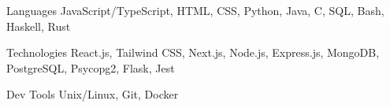 \begin{cvskills}
    \cvskill
        {Languages} %
        {JavaScript/TypeScript, HTML, CSS, Python, Java, C, SQL, Bash, Haskell, Rust} %
    
    \cvskill
        {Technologies} %
        {React.js, Tailwind CSS, Next.js, Node.js, Express.js, MongoDB, PostgreSQL, Psycopg2, Flask, Jest} %
    
    \cvskill
        {Dev Tools} %
        {Unix/Linux, Git, Docker} %
\end{cvskills}